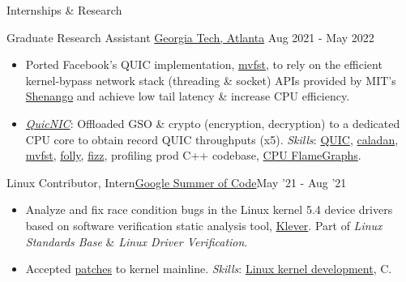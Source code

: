 \documentclass[]{mcdowellcv}
\begin{document}
  \begin{cvsection}{Internships \& Research}
    \begin{cvsubsection}
      {Graduate Research Assistant}
      {\href{https://scs.gatech.edu/}{Georgia Tech, Atlanta}}
      {Aug 2021 - May 2022}
        \begin{itemize}
            \item Ported Facebook's QUIC implementation, \href{https://github.com/facebookincubator/mvfst}{mvfst}, to rely on the efficient kernel-bypass network stack (threading \& socket) APIs provided by MIT's \href{https://www.usenix.org/conference/nsdi19/presentation/ousterhout}{Shenango} and achieve low tail latency \& increase CPU efficiency.
            \item \href{https://github.com/saubhik/caladan/pulls}{\textit{QuicNIC}}: Offloaded GSO \& crypto (encryption, decryption) to a dedicated CPU core to obtain record QUIC throughputs (x5). \textit{Skills}:
            \href{https://quicwg.org/}{QUIC},
            \href{https://github.com/shenango/caladan}{caladan}, \href{https://github.com/facebookincubator/mvfst}{mvfst}, \href{https://github.com/facebook/folly}{folly}, \href{https://github.com/facebookincubator/fizz}{fizz}, profiling prod C++ codebase, \href{https://www.brendangregg.com/FlameGraphs/cpuflamegraphs.html}{CPU FlameGraphs}.
        \end{itemize}
    \end{cvsubsection}

    \begin{cvsubsection}{Linux Contributor, Intern}{\href{https://summerofcode.withgoogle.com/archive/2021/projects/4818588170452992}{Google Summer of Code}}{May '21 - Aug '21}
        \begin{itemize}
            \item Analyze and fix race condition bugs in the Linux kernel 5.4 device drivers based on software verification static analysis tool, \href{https://forge.ispras.ru/projects/klever}{Klever}. Part of \textit{Linux Standards Base} \& \textit{Linux Driver Verification}.
            \item Accepted \href{https://lore.kernel.org/lkml/?q=saubhik}{patches} to kernel mainline. \textit{Skills}: \href{https://www.kernel.org/}{Linux kernel development}, C.
        \end{itemize}
    \end{cvsubsection}
  \end{cvsection}
\end{document}
